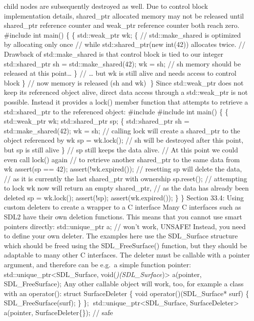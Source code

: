{child nodes are subsequently destroyed as well. Due to control block
implementation details, shared\_ptr allocated memory may not be released
until shared\_ptr reference counter and weak\_ptr reference counter both
reach zero. \#include int main() \{ \{ std::weak\_ptr wk; \{ //
std::make\_shared is optimized by allocating only once // while
std::shared\_ptr(new int(42)) allocates twice. // Drawback of
std::make\_shared is that control block is tied to our integer
std::shared\_ptr sh = std::make\_shared(42); wk = sh; // sh memory
should be released at this point\ldots{} \} // \ldots{} but wk is still
alive and needs access to control block \} // now memory is released (sh
and wk) \} Since std::weak\_ptr does not keep its referenced object
alive, direct data access through a std::weak\_ptr is not possible.
Instead it provides a lock() member function that attempts to retrieve a
std::shared\_ptr to the referenced object: \#include \#include int
main() \{ \{ std::weak\_ptr wk; std::shared\_ptr sp; \{ std::shared\_ptr
sh = std::make\_shared(42); wk = sh; // calling lock will create a
shared\_ptr to the object referenced by wk sp = wk.lock(); // sh will be
destroyed after this point, but sp is still alive \} // sp still keeps
the data alive. // At this point we could even call lock() again // to
retrieve another shared\_ptr to the same data from wk assert(}sp == 42);
assert(!wk.expired()); // resetting sp will delete the data, // as it is
currently the last shared\_ptr with ownership sp.reset(); // attempting
to lock wk now will return an empty shared\_ptr, // as the data has
already been deleted sp = wk.lock(); assert(!sp); assert(wk.expired());
\} \} Section 33.4: Using custom deleters to create a wrapper to a C
interface Many C interfaces such as SDL2 have their own deletion
functions. This means that you cannot use smart pointers directly:
std::unique\_ptr a; // won't work, UNSAFE! Instead, you need to deﬁne
your own deleter. The examples here use the SDL\_Surface structure which
should be freed using the SDL\_FreeSurface() function, but they should
be adaptable to many other C interfaces. The deleter must be callable
with a pointer argument, and therefore can be e.g.~a simple function
pointer: std::unique\_ptr\textless SDL\_Surface,
void(\emph{)(SDL\_Surface})\textgreater{} a(pointer, SDL\_FreeSurface);
Any other callable object will work, too, for example a class with an
operator(): struct SurfaceDeleter \{ void operator()(SDL\_Surface* surf)
\{ SDL\_FreeSurface(surf); \} \};
std::unique\_ptr\textless SDL\_Surface, SurfaceDeleter\textgreater{}
a(pointer, SurfaceDeleter\{\}); // safe

